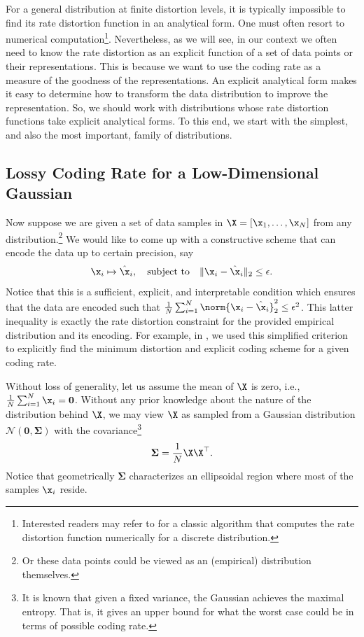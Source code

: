 \documentclass[../../book-main.tex]{subfiles}
\begin{document}
For a general distribution at finite distortion levels, it is typically impossible to find its rate
distortion function in an analytical form. One must often resort to numerical computation\footnote{Interested readers may refer to \cite{Blahut-1972} for a classic algorithm that computes the rate distortion function numerically for a discrete distribution.}.  Nevertheless, as we will see, in our context we often need to know the rate distortion as an explicit function of a set of data points or their representations. This is because we want to use the coding rate as a measure of the goodness of the representations. An explicit analytical form makes it easy to determine how to transform the data distribution to improve the representation. So, we should work with distributions whose rate distortion functions take explicit analytical forms. To this end, we start with the simplest, and also the most important, family of distributions.

\subsection{Lossy Coding Rate for a Low-Dimensional Gaussian}\label{subsec:lossy DR}
Now suppose we are given a set of data samples in $\X = [\x_1, \ldots, \x_N]$ from any distribution.\footnote{Or these data points could be viewed as an (empirical) distribution themselves.} We would like to come up with a constructive scheme that can encode the data up to certain precision, say
\begin{equation}
	\x_i \mapsto \hat \x_i, \quad \mbox{subject to} \quad \|\x_i - \hat \x_i\|_2 \le \epsilon.
\end{equation}
Notice that this is a sufficient, explicit, and interpretable condition which
ensures that the data are encoded such that \(\frac{1}{N}\sum_{i = 1}^{N}
\norm{\x_i- \hat \x_i}_2^{2} \le \epsilon^{2}\). This latter inequality is exactly the rate distortion constraint for the provided empirical distribution and its encoding. For example, in , we used this simplified criterion to explicitly find the minimum distortion and explicit coding scheme for a given coding rate.

Without loss of generality, let us assume the mean of $\X$ is zero, i.e., $\frac{1}{N} \sum_{i = 1}^{N} \x_i = \boldsymbol{0}$. Without any prior knowledge about the nature of the distribution behind $\X$, we may view $\X$ as sampled from a Gaussian distribution $\mathcal{N}(\boldsymbol{0}, {\boldsymbol{\Sigma}})$ with the covariance\footnote{It is known that given a fixed variance, the Gaussian achieves the maximal entropy. That is, it gives an upper bound for what the worst case could be in terms of possible coding rate.}
\begin{equation}
	{\boldsymbol{\Sigma}} = \frac{1}{N} \X\X^\top.
\end{equation}
Notice that geometrically ${\boldsymbol{\Sigma}}$ characterizes an ellipsoidal region where most of the samples $\x_i$ reside.
\end{document}
